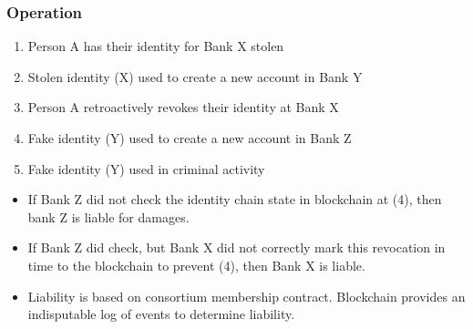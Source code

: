 \documentclass[8pt]{beamer}
\begin{document}
\begin{frame}[fragile]
\frametitle{Operation}
\begin{enumerate}
 \item Person A has their identity for Bank X stolen
 \item Stolen identity (X) used to create a new account in Bank Y
 \item Person A retroactively revokes their identity at Bank X
 \item Fake identity (Y) used to create a new account in Bank Z
 \item Fake identity (Y) used in criminal activity
\end{enumerate}
\begin{itemize}
 \item If Bank Z did not check the identity chain state in blockchain at (4), then bank Z is liable for damages.
 \item If Bank Z did check, but Bank X did not correctly mark this revocation in time to the blockchain to prevent (4), then Bank X is liable.
 \item Liability is based on consortium membership contract. Blockchain provides an indisputable log of events to determine liability.
\end{itemize}

\end{frame}
\end{document}
